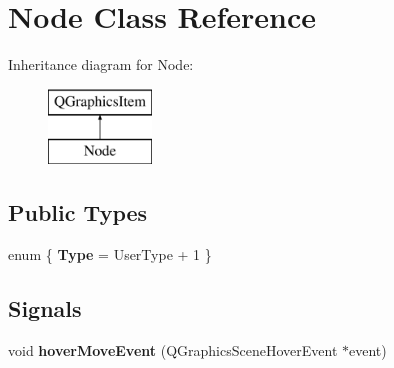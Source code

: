 \hypertarget{class_node}{}\section{Node Class Reference}
\label{class_node}
Inheritance diagram for Node\+:\begin{figure}[H]
\begin{center}
\leavevmode
\includegraphics[height=2.000000cm]{class_node}
\end{center}
\end{figure}
\subsection*{Public Types}
\begin{DoxyCompactItemize}
\item 
\mbox{\label{class_node_a794d640fba92f31b21a3b5394373acb1}} 
enum \{ {\bfseries Type} = User\+Type + 1
 \}
\end{DoxyCompactItemize}
\subsection*{Signals}
\begin{DoxyCompactItemize}
\item 
\mbox{\label{class_node_abb49e9ed6007ab9bcfaf983d4e1d365a}} 
void {\bfseries hover\+Move\+Event} (Q\+Graphics\+Scene\+Hover\+Event $\ast$event)
\end{DoxyCompactItemize}
